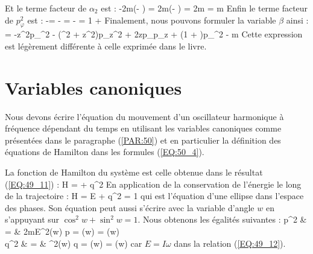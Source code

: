 \eenn
Et le terme facteur de $\alpha_{2}$ est :
\benn
	-2m\sigma{}(\eta - \xi) = 2m\sigma{}(\xi - \eta) = 2m\sigma{}\times{}\times{} = m\sigma{}
\eenn
Enfin le terme facteur de $p_{\varphi}^{2}$ est :
\benn
	-= - = - = 1 + 
\eenn
Finalement, nous pouvons formuler la variable $\beta$ ainsi :
\benn
	\beta = -z^{2}p_{\rho}^{2} - (\rho^{2} + z^{2})p_{z}^{2} + 2\rho zp_{\rho}p_{z} + \left(1 + \right)p_{\varphi}^{2} - m\sigma{}
\eenn
Cette expression est l\'{e}g\`{e}rement diff\'{e}rente \`{a} celle exprim\'{e}e dans le livre.

\section{Variables canoniques}\label{PAR:50_EX}

Nous devons \'{e}crire l'\'{e}quation du mouvement d'un oscillateur harmonique \`{a} fr\'{e}quence d\'{e}pendant du temps en utilisant les variables canoniques comme pr\'{e}sent\'{e}es dans le paragraphe (\ref{PAR:50}) et en particulier la d\'{e}finition des \'{e}quations de Hamilton dans les formules (\ref{EQ:50_4}).

La fonction de Hamilton du syst\`{e}me est celle obtenue dans le r\'{e}sultat (\ref{EQ:49_11}) :
\benn
	H =  + q^{2}
\eenn
En application de la conservation de l'\'{e}nergie le long de la trajectoire :
\benn
	H = E \Leftrightarrow {} + q^{2} = 1
\eenn
qui est l'\'{e}quation d'une ellipse dans l'espace des phases. Son \'{e}quation peut aussi s'\'{e}crire avec la variable d'angle $w$ en s'appuyant sur $\cos^{2}w + \sin^{2}w = 1$. Nous obtenons les \'{e}galit\'{e}s suivantes :
\bea
	p^{2} & = & 2mE\cos^{2}(w) \Leftrightarrow p = \pm{}\cos(w) = \pm{}\cos(w) \nonumber \\
	q^{2} & = & \sin^{2}(w) \Leftrightarrow q = \pm{}\sin(w) = \pm{}\sin(w)
\eea
car $E = I\omega$ dans la relation (\ref{EQ:49_12}).

